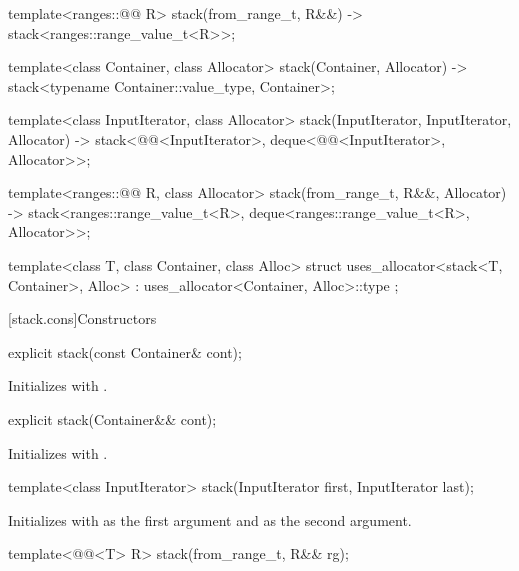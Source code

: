 \begin{codeblock}
{  template<ranges::@@ R>
    stack(from_range_t, R&&) -> stack<ranges::range_value_t<R>>;

  template<class Container, class Allocator>
    stack(Container, Allocator) -> stack<typename Container::value_type, Container>;

  template<class InputIterator, class Allocator>
    stack(InputIterator, InputIterator, Allocator)
      -> stack<@@<InputIterator>, deque<@@<InputIterator>,
               Allocator>>;

  template<ranges::@@ R, class Allocator>
    stack(from_range_t, R&&, Allocator)
      -> stack<ranges::range_value_t<R>, deque<ranges::range_value_t<R>, Allocator>>;

  template<class T, class Container, class Alloc>
    struct uses_allocator<stack<T, Container>, Alloc>
      : uses_allocator<Container, Alloc>::type { };
}
\end{codeblock}

[stack.cons]{Constructors}

%
\begin{itemdecl}
explicit stack(const Container& cont);
\end{itemdecl}

\begin{itemdescr}
\pnum
\effects
Initializes  with .
\end{itemdescr}

%
\begin{itemdecl}
explicit stack(Container&& cont);
\end{itemdecl}

\begin{itemdescr}
\pnum
\effects
Initializes  with .
\end{itemdescr}

%
\begin{itemdecl}
template<class InputIterator>
  stack(InputIterator first, InputIterator last);
\end{itemdecl}

\begin{itemdescr}
\pnum
\effects
Initializes  with
 as the first argument and  as the second argument.
\end{itemdescr}

%
\begin{itemdecl}
template<@@<T> R>
  stack(from_range_t, R&& rg);
\end{itemdecl}

